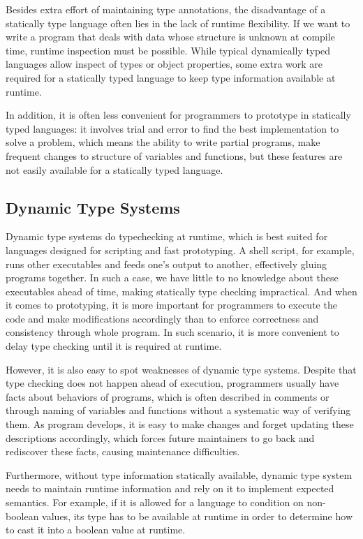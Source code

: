 Besides extra effort of maintaining type annotations,
the disadvantage of a statically type language often lies in the lack of runtime flexibility.
If we want to write a program that deals with data whose structure is
unknown at compile time, runtime inspection must be possible.
While typical dynamically typed languages allow inspect of types or object properties,
some extra work are required for a statically typed language
to keep type information available at runtime.

In addition, it is often less convenient for programmers to prototype
in statically typed languages: it involves trial and error to find the best implementation
to solve a problem, which means the ability to write partial programs,
make frequent changes to structure of variables and functions, but these features are not easily available for a statically typed language.

\subsection{Dynamic Type Systems}

Dynamic type systems do typechecking at runtime, which is best suited for
languages designed for scripting and fast prototyping.
A shell script, for example, runs other executables and feeds one's output to another, effectively gluing programs together.
In such a case, we have little to no knowledge about these executables ahead of time,
making statically type checking impractical.
And when it comes to prototyping,
it is more important for programmers to execute the code and make modifications accordingly
than to enforce correctness and consistency through whole program.
In such scenario, it is more convenient to delay type checking until
it is required at runtime.

However, it is also easy to spot weaknesses of dynamic type systems.
Despite that type checking does not happen ahead of execution,
programmers usually have facts about behaviors of programs,
which is often described in comments or through naming of variables and functions without a systematic way of verifying them.
As program develops, it is easy to make changes and forget updating these descriptions accordingly, which forces future maintainers to go back and rediscover these facts, causing maintenance difficulties.


Furthermore, without type information statically available,
dynamic type system needs to maintain runtime information
and rely on it to implement expected semantics.
For example, if it is allowed for a language to condition on non-boolean values,
its type has to be available at runtime in order to
determine how to cast it into a boolean value at runtime.


